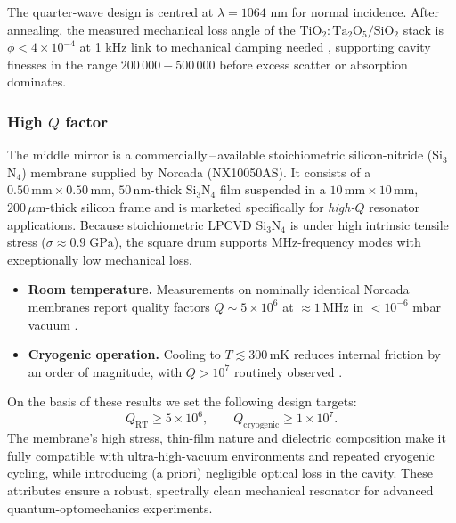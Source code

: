The quarter‐wave design is centred at $\lambda = 1064$ nm for normal incidence.  After annealing, the measured mechanical loss angle of the $\mathrm{TiO_2\!:\!Ta_2O_5}/\mathrm{SiO_2}$ stack is $\phi < 4\times10^{-4}$ at 1 kHz  \color{red} link to mechanical damping needed \color{black}, supporting cavity finesses in the range $200\,000-500\,000$ before excess scatter or absorption dominates\cite{AmatoPhD}.

\subsubsection{High $Q$ factor}

The middle mirror is a commercially\,–\,available stoichiometric silicon-nitride
(Si$_3$N$_4$) membrane supplied by Norcada (NX10050AS)\cite{SiN_review,Norcada_datasheet}.
It consists of a $0.50\,\mathrm{mm}\times0.50\,\mathrm{mm}$, $50\,\mathrm{nm}$-thick
Si$_3$N$_4$ film suspended in a $10\,\mathrm{mm}\times10\,\mathrm{mm}$,
$200\,\mu\mathrm{m}$-thick silicon frame and is marketed specifically for
\emph{high-$Q$} resonator applications. Because stoichiometric LPCVD Si$_3$N$_4$ is under high intrinsic tensile
stress ($\sigma\!\approx\!0.9\;\mathrm{GPa}$), the square drum supports
MHz-frequency modes with exceptionally low mechanical loss\cite{SiN_review}.

\begin{itemize}
  \item \textbf{Room temperature.}  Measurements on nominally identical
        Norcada membranes report quality factors
        $Q \sim 5\times10^{6}$ at $\approx1\,\mathrm{MHz}$ in
        $<10^{-6}$ mbar vacuum \cite{SiN_review,Norcada_datasheet}.
  \item \textbf{Cryogenic operation.}  Cooling to $T \lesssim 300\,\mathrm{mK}$
        reduces internal friction by an order of magnitude, with
        $Q>10^{7}$ routinely observed \cite{SiN_cryogenic}.
\end{itemize}

On the basis of these results we set the following design targets:
\[
  Q_{\mathrm{RT}} \ge 5\times10^{6}, \qquad
  Q_{\mathrm{cryogenic}} \ge 1\times10^{7}.
\]
The membrane’s high stress, thin-film nature and dielectric composition make
it fully compatible with ultra-high-vacuum environments and repeated
cryogenic cycling, while introducing (a priori) negligible optical loss in the cavity.
These attributes ensure a robust, spectrally clean mechanical resonator for
advanced quantum-optomechanics experiments.

